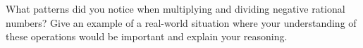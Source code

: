 \documentclass[12pt]{article}
\begin{document}
\vspace{1em}

\begin{tcolorbox}[colframe=black!60, colback=white, 
coltitle=black, colbacktitle=black!15, fonttitle=\bfseries\Large, 
title=Reflection, halign title=center, left=10pt, right=10pt, top=10pt, bottom=110pt]
What patterns did you notice when multiplying and dividing negative rational numbers? Give an example of a real-world situation where your understanding of these operations would be important and explain your reasoning.
\end{tcolorbox}
\end{document}
